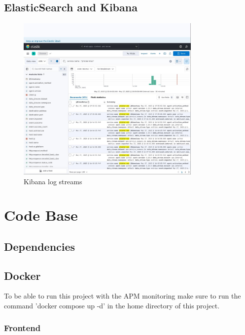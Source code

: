 \documentclass[a4paper,10pt]{article}
\begin{document}
\subsection{ElasticSearch and Kibana}


\begin{figure}[h]
	\centering
	\includegraphics[width=0.8\textwidth]{doc-img/kibana-logs.jpg}
	\caption{Kibana log streams}
	\label{fig:kibana-logs}
\end{figure}


\section{Code Base}

\subsection{Dependencies}

\subsection{Docker}

To be able to run this project with the APM monitoring make sure to run the
command 'docker compose up -d' in the home directory of this project.

\subsubsection{Frontend}
\end{document}
